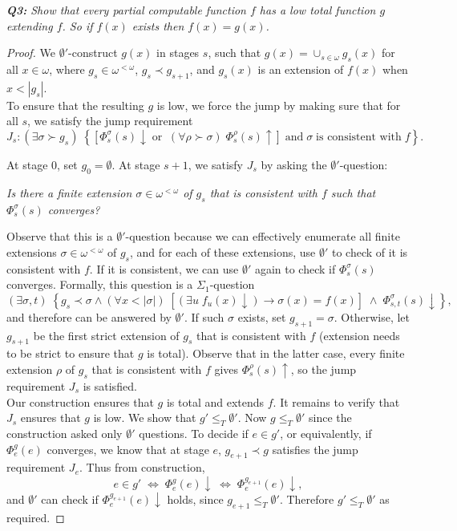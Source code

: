 \documentclass{article}
\begin{document}
\it \textbf{Q3:} Show that every partial computable function $f$ has a low
  total function $g$ extending $f$. So if $f(x)$ exists then $f(x)=g(x)$.

  \begin{proof}
    We $\emptyset'$-construct $g(x)$ in stages $s$, such that
    $g(x)=\cup_{s\in\omega} g_s(x)$ for all $x\in\omega$, where $g_s\in
    \omega^{<\omega}$, $g_s\prec g_{s+1}$, and $g_s(x)$ is an extension of
    $f(x)$ when $x<|g_s|$. \\

    To ensure that the resulting $g$ is low, we force the jump by
    making sure that for all $s$, we satisfy the jump requirement
    \[J_s: (\exists \sigma\succ g_s)\; \left\{ \left[
    \Phi_s^{\sigma}(s)\downarrow\; \text{or}\;\; (\forall
    \rho\succ\sigma)\; \Phi_s^{\rho}(s)\uparrow \right]\; \text{and}\;
    \sigma\; \text{is consistent with}\; f\right\}.\]

    At stage 0, set $g_0=\emptyset$. At stage $s+1$, we satisfy $J_s$ by
    asking the $\emptyset'$-question:
    \begin{center}
      \textit{Is there a finite extension $\sigma\in\omega^{<\omega}$ of
      $g_s$ that is consistent with $f$ such that $\Phi^\sigma_s(s)$
      converges?}
    \end{center}

    Observe that this is a $\emptyset'$-question because we can
    effectively enumerate all finite extensions
    $\sigma\in\omega^{<\omega}$ of $g_s$, and for each of these extensions,
    use $\emptyset'$ to check of it is consistent with $f$. If it is
    consistent, we can use $\emptyset'$ again to check if
    $\Phi^\sigma_s(s)$ converges. Formally, this question is a
    $\Sigma_1$-question
    \[(\exists \sigma,t)\; \left\{ g_s\prec\sigma \wedge (\forall
    x<|\sigma|)\; \left[ (\exists u\; f_u(x)\downarrow)
    \rightarrow\sigma(x)=f(x) \right]\; \wedge\;
    \Phi^\sigma_{s,t}(s)\downarrow \right\},\]
    and therefore can be answered by $\emptyset'$. If such $\sigma$ exists,
    set $g_{s+1}=\sigma$. Otherwise, let $g_{s+1}$ be the first strict
    extension of $g_s$ that is consistent with $f$ (extension needs to be
    strict to ensure that $g$ is total). Observe that in the latter case,
    every finite extension $\rho$ of $g_s$ that is consistent with $f$
    gives $\Phi_s^\rho(s)\uparrow$, so the jump requirement $J_s$ is
    satisfied. \\

    Our construction ensures that $g$ is total and extends $f$. It remains
    to verify that $J_s$ ensures that $g$ is low. We show that
    $g'\leq_T\emptyset'$. Now $g\leq_T\emptyset'$ since the construction
    asked only $\emptyset'$ questions. To decide if $e\in g'$, or
    equivalently, if $\Phi_e^g(e)$ converges, we know that at stage $e$,
    $g_{e+1}\prec g$ satisfies the jump requirement $J_e$. Thus from
    construction, \[e\in g'\; \Leftrightarrow\; \Phi_e^g(e)\downarrow\;
    \Leftrightarrow\; \Phi_e^{g_{e+1}}(e)\downarrow,\] and $\emptyset'$ can
    check if $\Phi_e^{g_{e+1}}(e)\downarrow$ holds, since $g_{e+1}\leq_T
    \emptyset'$. Therefore $g'\leq_T\emptyset'$ as required.
  \end{proof}
\end{document}
